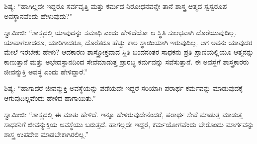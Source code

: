  ಶಿಷ್ಯ: “ಹಾಗಿಲ್ಲದೇ ಇದ್ದರೂ ಸರ್ವವೃತ್ತಿ ಮತ್ತು ಕರ್ಮದ ನಿರೋಧನವನ್ನೇ ತಾನೆ ಶಾಸ್ತ್ರ ಆತ್ಮದ ಸ್ವಸ್ವರೂಪ ಅವಸ್ಥಾನವೆಂದು ಹೇಳುವುದು?” 

 ಸ್ವಾಮೀಜಿ: “ಶಾಸ್ತ್ರದಲ್ಲಿ ಯಾವುದನ್ನು ಸಮಾಧಿ ಎಂದು ಹೇಳಿದೆಯೋ ಆ ಸ್ಥಿತಿ ಸುಲಭವಾಗಿ ದೊರೆಯುವುದಿಲ್ಲ. ಯಾವಾಗಲಾದರೂ, ಯಾರಿಗಾದರೂ, ದೊರೆತರೂ ಹೆಚ್ಚು ಕಾಲ ಸ್ಥಾಯಿಯಾಗಿ ಇರುವುದಿಲ್ಲ. ಆಗ ಅವನು ಯಾವುದರ ಮೇಲೆ ಇರಬೇಕು ಹೇಳು? ಆದಕಾರಣ ಶಾಸ್ತ್ರೋಕ್ತವಾದ ಸ್ಥಿತಿ ಬಂದನಂತರ ಸಾಧಕನು ಪ್ರತಿ ಪ್ರಾಣಿಯಲ್ಲಿಯೂ ಆತ್ಮನನ್ನು ಕಾಣುತ್ತಾನೆ ಮತ್ತು ಅಭೇದಸ್ಥಾನದಿಂದ ಸೇವೆಮಾಡುತ್ತ ಪ್ರಾರಬ್ಧ ಕರ್ಮವನ್ನು ಸವೆಸುತ್ತಾನೆ. ಈ ಅವಸ್ಥೆಗೆ ಶಾಸ್ತ್ರಕಾರರು ಜೀವನ್ಮುಕ್ತಿ ಅವಸ್ಥೆ ಎಂದು ಹೇಳಿದ್ದಾರೆ.” 

 ಶಿಷ್ಯ: “ಹಾಗಾದರೆ ಜೀವನ್ಮುಕ್ತಿ ಅವಸ್ಥೆಯನ್ನು ಪಡೆಯದೇ ಇದ್ದರೆ ಸರಿಯಾಗಿ ಪರಾರ್ಥ ಕರ್ಮವನ್ನು ಮಾಡುವುದಕ್ಕೆ ಆಗುವುದಿಲ್ಲವೆಂದು ಹೇಳಿದ ಹಾಗಾಯಿತು.” 

 ಸ್ವಾಮೀಜಿ: “ಶಾಸ್ತ್ರದಲ್ಲಿ ಈ ಮಾತು ಹೇಳಿದೆ. ಇನ್ನೂ ಹೇಳಿರುವುದೇನೆಂದರೆ, ಪರಾರ್ಥ ಸೇವೆ ಮಾಡುತ್ತ ಮಾಡುತ್ತ ಸಾಧಕನಿಗೆ ಜೀವನ್ಮುಕ್ತಿಯ ಅವಸ್ಥೆಯು ಬರುತ್ತದೆ. ಹಾಗಲ್ಲದೇ ಇದ್ದರೆ, ಕರ್ಮಯೋಗವೆಂದು ಬೇರೊಂದು ಮಾರ್ಗವನ್ನು ಶಾಸ್ತ್ರ ಉಪದೇಶ ಮಾಡಬೇಕಾಗಿರಲಿಲ್ಲ.” 

